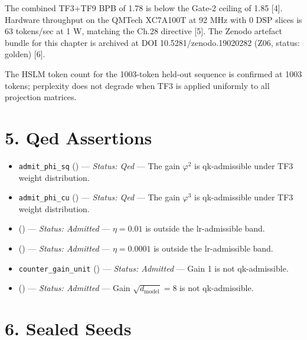 The combined TF3+TF9 BPB of 1.78 is below the
Gate-2 ceiling of 1.85 [4]. Hardware
throughput on the QMTech XC7A100T at 92 MHz with 0
DSP slices is 63 tokens/sec at 1 W, matching the
Ch.28 directive [5]. The Zenodo artefact
bundle for this chapter is archived at DOI
10.5281/zenodo.19020282 (Z06, status: golden)
[6].

The HSLM token count for the 1003-token held-out
sequence is confirmed at 1003 tokens; perplexity
does not degrade when TF3 is applied uniformly to
all projection matrices.

\section{5. Qed
Assertions}\label{fa_08:qed-assertions}

\begin{itemize}
\tightlist
\item
  \texttt{admit\_phi\_sq}
  ()
  --- \emph{Status: Qed} --- The gain
  \(\varphi^2\) is qk-admissible under TF3 weight
  distribution.
\item
  \texttt{admit\_phi\_cu}
  ()
  --- \emph{Status: Qed} --- The gain
  \(\varphi^3\) is qk-admissible under TF3 weight
  distribution.
\item
  ()
  --- \emph{Status: Admitted} --- \(\eta = 0.01\)
  is outside the lr-admissible band.
\item
  ()
  --- \emph{Status: Admitted} ---
  \(\eta = 0.0001\) is outside the lr-admissible
  band.
\item
  \texttt{counter\_gain\_unit}
  ()
  --- \emph{Status: Admitted} --- Gain 1 is not
  qk-admissible.
\item
  ()
  --- \emph{Status: Admitted} --- Gain
  \(\sqrt{d_\text{model}}=8\) is not
  qk-admissible.
\end{itemize}

\section{6. Sealed Seeds}\label{fa_08:sealed-seeds}

